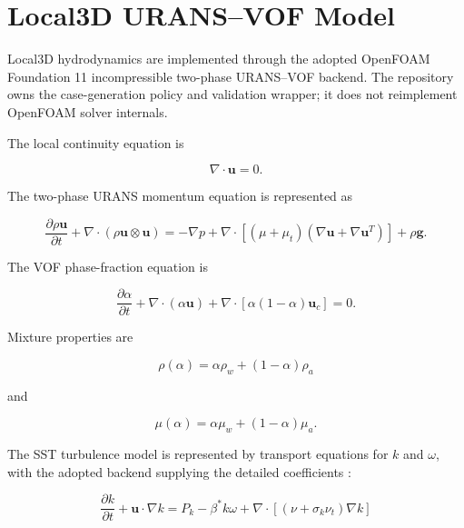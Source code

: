 \section{Local3D URANS--VOF Model}

Local3D hydrodynamics are implemented through the adopted OpenFOAM Foundation 11 incompressible two-phase URANS--VOF backend. The repository owns the case-generation policy and validation wrapper; it does not reimplement OpenFOAM solver internals.

The local continuity equation is

\begin{equation}
\label{eq:local-continuity}
\nabla\cdot\mathbf u=0.
\end{equation}

The two-phase URANS momentum equation is represented as

\begin{equation}
\label{eq:urans-momentum}
\frac{\partial \rho\mathbf u}{\partial t}
+
\nabla\cdot(\rho\mathbf u\otimes\mathbf u)
=
-
\nabla p
+
\nabla\cdot\left[
(\mu+\mu_t)
\left(\nabla\mathbf u+\nabla\mathbf u^{T}\right)
\right]
+
\rho\mathbf g .
\end{equation}

The VOF phase-fraction equation is

\begin{equation}
\label{eq:vof-transport}
\frac{\partial\alpha}{\partial t}
+
\nabla\cdot(\alpha\mathbf u)
+
\nabla\cdot
\left[
\alpha(1-\alpha)\mathbf u_c
\right]
=
0 .
\end{equation}

Mixture properties are

\begin{equation}
\label{eq:mixture-density}
\rho(\alpha)=\alpha\rho_w+(1-\alpha)\rho_a
\end{equation}

and

\begin{equation}
\label{eq:mixture-viscosity}
\mu(\alpha)=\alpha\mu_w+(1-\alpha)\mu_a .
\end{equation}

The SST turbulence model is represented by transport equations for \(k\) and \(\omega\), with the adopted backend supplying the detailed coefficients \autocite{menter1994twoequation}:

\begin{equation}
\label{eq:sst-k}
\frac{\partial k}{\partial t}
+
\mathbf u\cdot\nabla k
=
P_k-\beta^\ast k\omega
+
\nabla\cdot\left[(\nu+\sigma_k\nu_t)\nabla k\right]
\end{equation}

